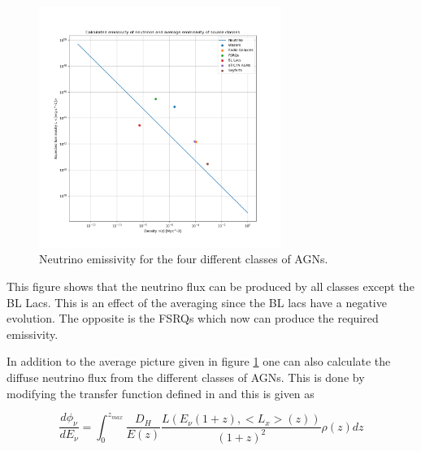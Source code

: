 \begin{figure}[H]
    \centering
    \includegraphics[width = 0.7\textwidth]{new_plots/L_n_neut_calc.png}
    \caption{Neutrino emissivity for the four different classes of AGNs.}
    \label{fig:neutrino}
\end{figure}

This figure shows that the neutrino flux can be produced by all classes except 
the BL Lacs. This is an effect of the averaging since the BL lacs have a negative evolution.
The opposite is the FSRQs which now can produce the required emissivity.

In addition to the average picture given in figure \ref*{fig:neutrino} one can also calculate the diffuse neutrino flux from the different classes of AGNs. This is done by modifying the transfer function defined in \cite{Palladino_2020} and this is given as


\begin{equation}
    \frac{d\phi_\nu}{dE_\nu} = \int_0^{z_{max}} \frac{D_H}{E(z)} \frac{L(E_\nu (1+z),<L_x>(z))}{(1+z)^2} \rho(z) dz
\end{equation}

